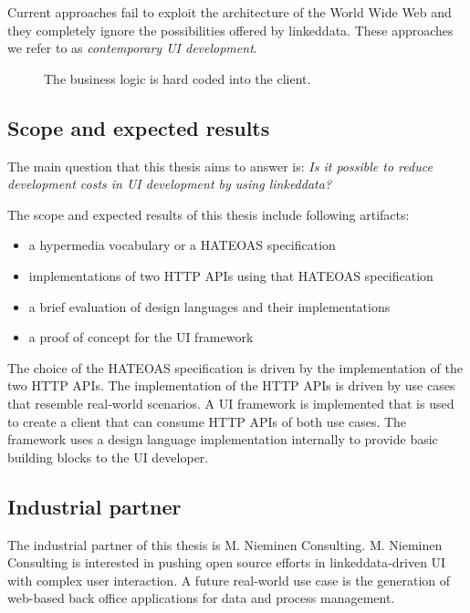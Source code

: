 Current approaches fail to exploit the architecture of the World Wide Web and they completely ignore the possibilities offered by \gls{linkeddata}. These approaches we refer to as \textit{contemporary UI development}.

\begin{figure}[!htb]
  \caption{The business logic is hard coded into the client.}
  \label{fig:hardcoded}
\end{figure}

\subsection{Scope and expected results}\label{sec:scope}
The main question that this thesis aims to answer is: \textit{Is it possible to reduce development costs in UI development by using \gls{linkeddata}?}

The scope and expected results of this thesis include following artifacts:

\begin{itemize}
\item a \gls{hypermedia} vocabulary or a HATEOAS specification
\item implementations of two HTTP APIs using that HATEOAS specification
\item a brief evaluation of design languages and their implementations
\item a proof of concept for the UI framework
\end{itemize}

The choice of the HATEOAS specification is driven by the implementation of the two HTTP APIs. The implementation of the HTTP APIs is driven by use cases that resemble real-world scenarios. A UI framework is implemented that is used to create a client that can consume HTTP APIs of both use cases. The framework uses a design language implementation internally to provide basic building blocks to the UI developer.

\subsection{Industrial partner}
The industrial partner of this thesis is M. Nieminen Consulting. M. Nieminen Consulting is interested in pushing open source efforts in \gls{linkeddata}-driven UI with complex user interaction. A future real-world use case is the generation of web-based back office applications for data and process management.
